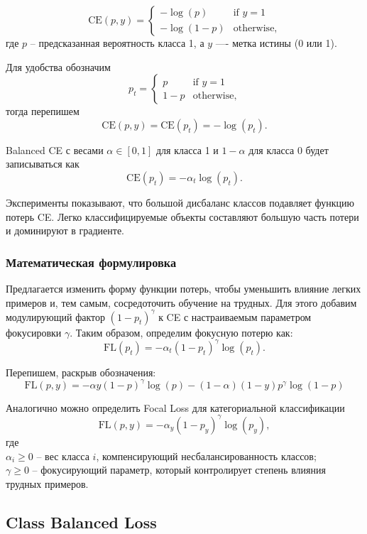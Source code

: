 \[ 
    \text{CE}(p, y) = \begin{cases}
        -\log(p) & \text{if } y=1 \\
        -\log(1-p) & \text{otherwise,}
    \end{cases}
\] 
где $p$ -- предсказанная вероятность класса 1, а $y$ —- метка истины (0 или 1).

Для удобства обозначим
\[
    p_t = \begin{cases}
        p & \text{if } y=1 \\
        1-p & \text{otherwise,}
    \end{cases}
\]
тогда перепишем
\[
    \text{CE}(p, y) = \text{CE}(p_t) = -\log(p_t).
\]
 
Balanced CE с весами $\alpha\in[0,1]$ для класса 1 и $1-\alpha$ для класса 0 будет записываться как
\[
    \text{CE}(p_t) = -\alpha_t\log(p_t).
\]

Эксперименты показывают, что большой дисбаланс классов подавляет функцию потерь CE. Легко классифицируемые объекты составляют большую часть потери и доминируют в градиенте.

\subsubsection*{Математическая формулировка}

Предлагается изменить форму функции потерь, чтобы уменьшить влияние легких примеров и, тем самым, сосредоточить обучение на трудных. Для этого добавим модулирующий фактор $(1-p_t)^\gamma$ к CE с настраиваемым параметром фокусировки $\gamma$. Таким образом, определим фокусную потерю как:
\[
    \text{FL}(p_t)=-\alpha_t(1-p_t)^\gamma\log(p_t).
\]

Перепишем, раскрыв обозначения:
\[ 
    \text{FL}(p, y) = -\alpha y(1 - p)^{\gamma} \log(p) - (1 - \alpha)(1 - y) p^{\gamma} \log(1 - p) 
\] 

Аналогично можно определить Focal Loss для категориальной классификации
\[
    \text{FL}(p,y)=-\alpha_y (1-p_y)^\gamma\log(p_y),
\]
где
\\\indent $\alpha_i \ge 0$ -- вес класса $i$, компенсирующий несбалансированность классов;
\\\indent $\gamma \ge 0$ -- фокусирующий параметр, который контролирует степень влияния трудных примеров.

\subsection*{Class Balanced Loss}

